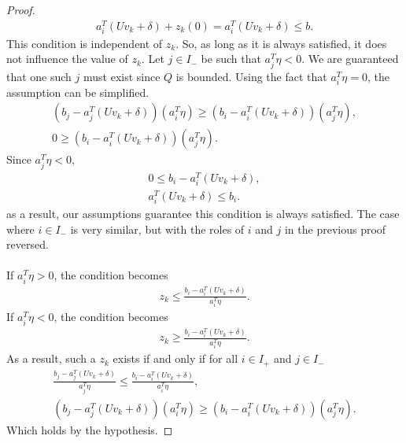 \documentclass[10pt,a4paper]{amsart}
\begin{document}
\begin{proof}
	\begin{gather*}
		a_i^T(Uv_k+\delta)+z_k(0) = a_i^T(Uv_k+\delta) \leq b.
	\end{gather*}
    This condition is independent of $z_k$. So, as long as it is always satisfied, it does not influence the value of $z_k$. Let $j \in I_-$ be such that $a_j^T \eta < 0$. We are guaranteed that one such $j$ must exist since $Q$ is bounded. Using the fact that $a_i^T\eta = 0$, the assumption can be simplified.
    \begin{gather*}
		(b_j-a_j^T(Uv_k+\delta))(a_i^T\eta) \geq (b_i-a_i^T(Uv_k+\delta))(a_j^T\eta),\\
        0 \geq (b_i-a_i^T(Uv_k+\delta))(a_j^T\eta).
	\end{gather*}
    Since $a_j^T\eta < 0$,
    \begin{gather*}
        0 \leq b_i-a_i^T(Uv_k+\delta),\\
        a_i^T(Uv_k+\delta) \leq b_i.
	\end{gather*}
	as a result, our assumptions guarantee this condition is always satisfied. The case where $i \in I_-$ is very similar, but with the roles of $i$ and $j$ in the previous proof reversed.\\\\
	If $a_i^T\eta > 0$, the condition becomes
	\begin{gather*}
		z_k \leq \frac{b_i-a_i^T(Uv_k+\delta)}{a_i^T\eta}.
	\end{gather*}
	If $a_i^T\eta < 0$, the condition becomes
	\begin{gather*}
		z_k \geq \frac{b_i-a_i^T(Uv_k+\delta)}{a_i^T\eta}.
	\end{gather*}
	As a result, such a $z_k$ exists if and only if for all $i \in I_+$ and $j \in I_-$
	\begin{gather*}
		\frac{b_j-a_j^T(Uv_k+\delta)}{a_j^T\eta} \leq \frac{b_i-a_i^T(Uv_k+\delta)}{a_i^T\eta},\\
		(b_j-a_j^T(Uv_k+\delta))(a_i^T\eta) \geq (b_i-a_i^T(Uv_k+\delta))(a_j^T\eta).
	\end{gather*}
    Which holds by the hypothesis.
\end{proof}
\end{document}
